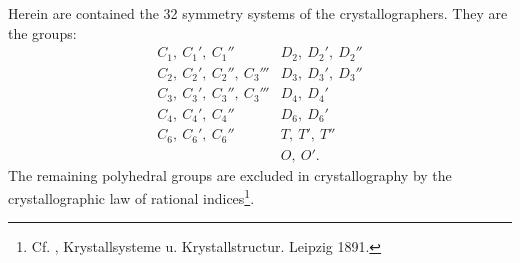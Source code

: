 Herein are contained the 32 symmetry systems of the crystallographers. They are the groups:
\[
\begin{array}{ll}
C_1,\ C_1',\ C_1'' & D_2,\ D_2',\ D_2''\\
C_2,\ C_2',\ C_2'',\ C_3''' & D_3,\ D_3',\ D_3''\\ %
C_3,\ C_3',\ C_3'',\ C_3''' & D_4,\ D_4'\\
C_4,\ C_4',\ C_4'' & D_6,\ D_6'\\
C_6,\ C_6',\ C_6'' & T,\ T',\ T''\\
 & O,\ O'.
\end{array}
\]
The remaining polyhedral groups are excluded in crystallography by the crystallographic law of rational indices\footnote{Cf. , Krystallsysteme u. Krystallstructur. Leipzig 1891.}.
